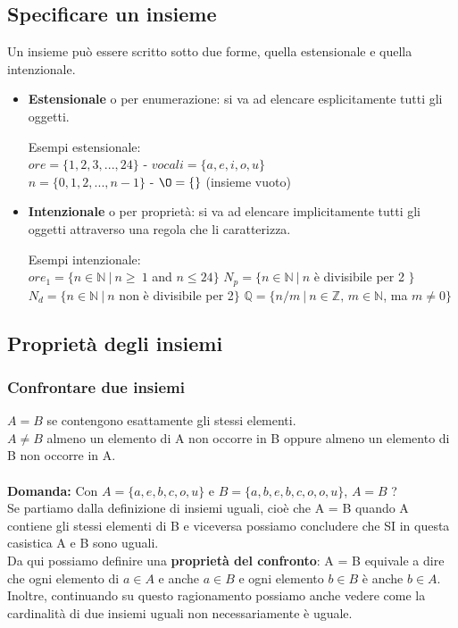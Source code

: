 \subsection{Specificare un insieme}
Un insieme può essere scritto sotto due forme, quella estensionale e quella intenzionale.
\begin{itemize}
    \item \textbf{Estensionale} o per enumerazione: si va ad elencare esplicitamente tutti gli oggetti.
    \begin{example}
        Esempi estensionale:\\
        \(ore = \{1, 2, 3, ..., 24\}\)  -  \(vocali = \{a, e, i, o, u\}\) \\
        $n = \{0, 1, 2, ..., n-1\}$  -  $\O = \{\}$ (insieme vuoto)
    \end{example}
    \item \textbf{Intenzionale} o per proprietà: si va ad elencare implicitamente tutti gli oggetti attraverso una regola che li caratterizza.
    \begin{example}
        Esempi intenzionale:\\
        $ore_1 = \{n \in \mathbb{N} \:|\: n \geq\ 1$ and $n \leq 24\}$ \hspace{.7cm} $N_p = \{n \in \mathbb{N} \:|\: n$ è divisibile per 2 $\}$ \\
        $N_d = \{n \in \mathbb{N} \:|\: n$ non è divisibile per 2$\}$ \hspace{.7cm} $\mathbb{Q} = \{n/m \:|\: n \in \mathbb{Z}, \, m \in \mathbb{N}$, ma $ m \neq 0\}$
    \end{example}
\end{itemize}

\newpage
\subsection{Proprietà degli insiemi}
\subsubsection{Confrontare due insiemi}
$A = B$ se contengono esattamente gli stessi elementi.\\
$A \neq B$ almeno un elemento di A non occorre in B oppure almeno un elemento di B non occorre in A.\\\\
\textbf{Domanda:} Con $A = \{a, e, b, c, o, u\}$ e $B = \{a, b, e, b, c, o, o, u\}$, $A = B$ ?\\
Se partiamo dalla definizione di insiemi uguali, cioè che A = B quando A contiene gli stessi elementi di B e viceversa possiamo concludere che SI in questa casistica A e B sono uguali. \\
Da qui possiamo definire una \textbf{proprietà del confronto}:
A = B equivale a dire che ogni elemento di $a \in A$ e anche $a \in B$ e ogni elemento $b \in B$ è anche $b \in A$. \\
Inoltre, continuando su questo ragionamento possiamo anche vedere come la cardinalità di due insiemi uguali non necessariamente è uguale.

